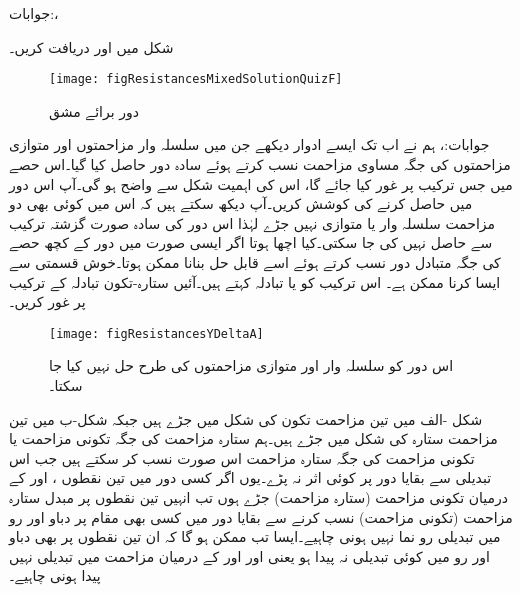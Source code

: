 جوابات:، 

شکل  میں   اور  دریافت کریں۔
\begin{figure}
\centering
\texttt{[image: figResistancesMixedSolutionQuizF]}
\caption{دور برائے مشق }
\label{شکل_مزاحمتی_متعدد_مشق_ٹ}
\end{figure}

جوابات:، 
\FloatBarrier
{}
ہم نے اب تک ایسے ادوار دیکھے جن میں سلسلہ وار مزاحمتوں اور متوازی مزاحمتوں کی جگہ مساوی مزاحمت نسب کرتے ہوئے سادہ دور حاصل کیا گیا۔اس حصے میں جس ترکیب پر غور کیا جائے گا، اس کی اہمیت شکل  سے واضح ہو گی۔آپ اس دور میں  حاصل کرنے کی کوشش کریں۔آپ دیکھ سکتے ہیں کہ اس میں کوئی بھی دو مزاحمت سلسلہ وار یا متوازی نہیں جڑے لہٰذا اس دور کی سادہ صورت گزشتہ ترکیب سے حاصل نہیں کی جا سکتی۔کیا اچھا ہوتا اگر ایسی صورت میں دور کے کچھ حصے کی جگہ متبادل دور نسب کرتے ہوئے اسے قابل حل بنانا ممکن ہوتا۔خوش قسمتی سے ایسا کرنا ممکن ہے۔ اس ترکیب کو  یا  تبادلہ کہتے ہیں۔آئیں ستارہ-تکون تبادلہ کے  ترکیب پر غور کریں۔ 
\begin{figure}
\centering
\texttt{[image: figResistancesYDeltaA]}
\caption{اس دور کو سلسلہ وار اور متوازی مزاحمتوں کی طرح حل نہیں کیا جا سکتا۔}
\label{شکل_مزاحمتی_ستارہ_تکون_الف}
\end{figure}


شکل -الف میں تین مزاحمت تکون کی شکل  میں جڑے ہیں جبکہ شکل-ب میں تین مزاحمت ستارہ کی شکل  میں جڑے ہیں۔ہم ستارہ مزاحمت کی جگہ تکونی مزاحمت یا تکونی مزاحمت کی جگہ ستارہ مزاحمت اس صورت نسب کر سکتے ہیں جب اس تبدیلی سے بقایا دور پر کوئی اثر نہ پڑے۔یوں اگر کسی دور میں تین نقطوں ،  اور  کے درمیان تکونی مزاحمت (ستارہ مزاحمت) جڑے ہوں تب انہیں تین نقطوں پر مبدل ستارہ مزاحمت (تکونی مزاحمت) نسب کرنے سے بقایا دور میں کسی بھی مقام پر دباو اور رو میں تبدیلی رو نما نہیں ہونی چاہیے۔ایسا تب ممکن ہو گا کہ ان تین نقطوں پر بھی دباو اور رو میں کوئی تبدیلی نہ پیدا ہو یعنی  اور  اور   کے درمیان مزاحمت میں تبدیلی نہیں پیدا ہونی چاہیے۔

